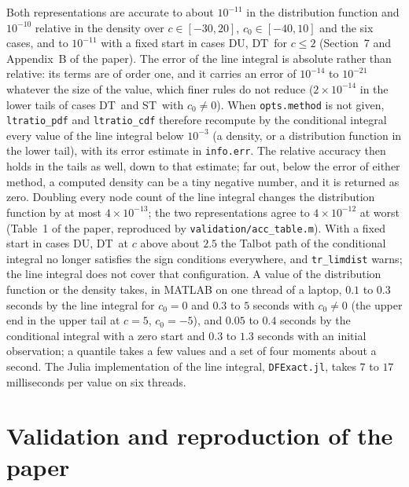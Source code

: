 \documentclass[11pt]{article}
\newcommand{\code}[1]{\texttt{#1}}
\newcommand{\Fu}{\textsf{DU}}
\newcommand{\Ft}{\textsf{DT}}
\newcommand{\St}{\textsf{ST}}
\begin{document}
Both representations are accurate to about $10^{-11}$ in the distribution function and $10^{-10}$ relative in the density over $c\in[-30,20]$, $c_0\in[-40,10]$ and the six cases, and to $10^{-11}$ with a fixed start in cases \Fu, \Ft\ for $c\le2$ (Section~7 and Appendix~B of the paper).  The error of the line integral is absolute rather than relative: its terms are of order one, and it carries an error of $10^{-14}$ to $10^{-21}$ whatever the size of the value, which finer rules do not reduce ($2\times10^{-14}$ in the lower tails of cases \Ft\ and \St\ with $c_0\ne0$).  When \code{opts.method} is not given, \code{ltratio\_pdf} and \code{ltratio\_cdf} therefore recompute by the conditional integral every value of the line integral below $10^{-3}$ (a density, or a distribution function in the lower tail), with its error estimate in \code{info.err}.  The relative accuracy then holds in the tails as well, down to that estimate; far out, below the error of either method, a computed density can be a tiny negative number, and it is returned as zero.  Doubling every node count of the line integral changes the distribution function by at most $4\times10^{-13}$; the two representations agree to $4\times10^{-12}$ at worst (Table~1 of the paper, reproduced by \code{validation/acc\_table.m}).  With a fixed start in cases \Fu, \Ft\ at $c$ above about $2.5$ the Talbot path of the conditional integral no longer satisfies the sign conditions everywhere, and \code{tr\_limdist} warns; the line integral does not cover that configuration.  A value of the distribution function or the density takes, in MATLAB on one thread of a laptop, $0.1$ to $0.3$ seconds by the line integral for $c_0=0$ and $0.3$ to $5$ seconds with $c_0\ne0$ (the upper end in the upper tail at $c=5$, $c_0=-5$), and $0.05$ to $0.4$ seconds by the conditional integral with a zero start and $0.3$ to $1.3$ seconds with an initial observation; a quantile takes a few values and a set of four moments about a second.  The Julia implementation of the line integral, \code{DFExact.jl}, takes $7$ to $17$ milliseconds per value on six threads.

\section{Validation and reproduction of the paper}
\label{sec:validation}
\end{document}
